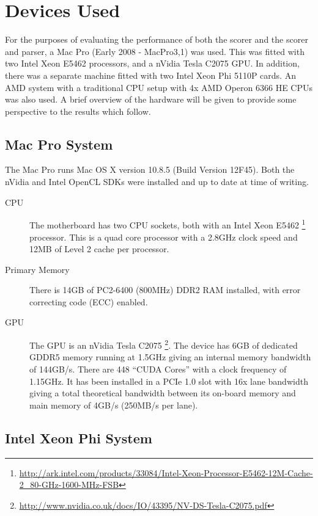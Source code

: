 \section{Devices Used}

For the purposes of evaluating the performance of both the scorer and the scorer
and parser, a Mac Pro (Early 2008 - MacPro3,1) was used. This was fitted with
two Intel Xeon E5462 processors, and a nVidia Tesla C2075 GPU. In addition,
there was a separate machine fitted with two Intel Xeon Phi 5110P cards. An AMD
system with a traditional CPU setup with 4x AMD Operon 6366 HE CPUs was also
used. A brief overview of the hardware will be given to provide some perspective
to the results which follow.

\subsection{Mac Pro System}

The Mac Pro runs Mac OS X version 10.8.5 (Build Version 12F45). Both the
nVidia and Intel OpenCL SDKs were installed and up to date at time of writing.

\begin{description}

\item[CPU] The motherboard has two CPU sockets, both with an Intel Xeon E5462
\footnote{\url{http://ark.intel.com/products/33084/Intel-Xeon-Processor-E5462-12M-Cache-2_80-GHz-1600-MHz-FSB}}
processor. This is a quad core processor with a 2.8GHz clock speed and 12MB of
Level 2 cache per processor.

\item[Primary Memory] There is 14GB of PC2-6400 (800MHz) DDR2 RAM installed,
with error correcting code (ECC) enabled.

\item[GPU] The GPU is an nVidia Tesla C2075
\footnote{\url{http://www.nvidia.co.uk/docs/IO/43395/NV-DS-Tesla-C2075.pdf}}.
The device has 6GB of dedicated GDDR5 memory running at 1.5GHz giving an
internal memory bandwidth of 144GB/s. There are 448 ``CUDA Cores'' with a clock
frequency of 1.15GHz. It has been installed in a PCIe 1.0 slot with 16x lane
bandwidth giving a total theoretical bandwidth between its on-board memory and
main memory of 4GB/s (250MB/s per lane).

\end{description}

\subsection{Intel Xeon Phi System}

